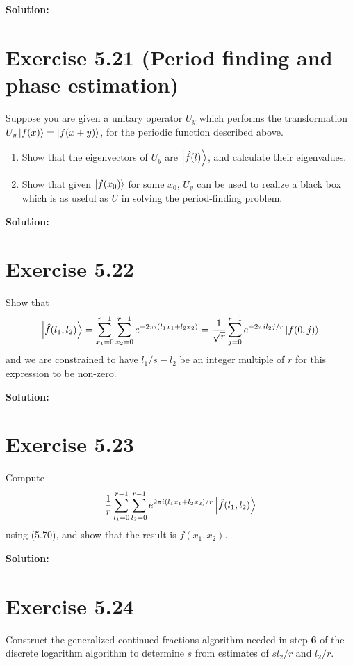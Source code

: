 \documentclass{book}
\begin{document}
    \textbf{Solution:}
    
\section*{Exercise 5.21 (Period finding and phase estimation)}
    Suppose you are given a unitary operator $U_y$ which performs the transformation $U_y\ket{f(x)} = \ket{f(x+y)}$, for the periodic function described above.
    \begin{enumerate}
        \item Show that the eigenvectors of $U_y$ are $\ket{\hat{f}(l)}$, and calculate their eigenvalues.
        \item Show that given $\ket{f(x_0)}$ for some $x_0$, $U_y$ can be used to realize a black box which is as useful as $U$ in solving the period-finding problem.
    \end{enumerate}
    
    \textbf{Solution:}
    
\section*{Exercise 5.22}
    Show that
    \begin{align}
        \ket{\hat{f}(l_1,l_2)} = \sum_{x_1=0}^{r-1} \sum_{x_2 = 0}^{r-1}e^{-2\pi i(l_1x_1+l_2x_2)} = \frac{1}{\sqrt{r}} \sum_{j=0}^{r-1}e^{-2\pi i l_2 j /r}\ket{f(0,j)}
    \end{align}
    and we are constrained to have $l_1/s-l_2$ be an integer multiple of $r$ for this expression to be non-zero.
    
    \textbf{Solution:}
    
\section*{Exercise 5.23}
    Compute
    \begin{align}
        \frac{1}{r}\sum_{l_1=0}^{r-1}\sum_{l_2=0}^{r-1} e^{2\pi i (l_1x_1+l_2x_2)/r}\ket{\hat{f}(l_1,l_2)}
    \end{align}
    using (5.70), and show that the result is $f(x_1,x_2)$.
    
    \textbf{Solution:}
    
\section*{Exercise 5.24}
    Construct the generalized continued fractions algorithm needed in step \textbf{6} of the discrete logarithm algorithm to determine $s$ from estimates of $s l_2/r$ and $l_2/r$.
    
\end{document}
